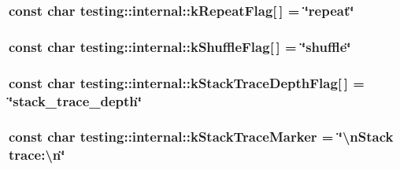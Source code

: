 \subsubsection[{\texorpdfstring{k\+Repeat\+Flag}{kRepeatFlag}}]{\setlength{\rightskip}{0pt plus 5cm}const char testing\+::internal\+::k\+Repeat\+Flag\mbox{[}$\,$\mbox{]} = \char`\"{}repeat\char`\"{}}\hypertarget{namespacetesting_1_1internal_a764ee423d39ebb8e10c53ab9b685cd9b}{}\label{namespacetesting_1_1internal_a764ee423d39ebb8e10c53ab9b685cd9b}
\subsubsection[{\texorpdfstring{k\+Shuffle\+Flag}{kShuffleFlag}}]{\setlength{\rightskip}{0pt plus 5cm}const char testing\+::internal\+::k\+Shuffle\+Flag\mbox{[}$\,$\mbox{]} = \char`\"{}shuffle\char`\"{}}\hypertarget{namespacetesting_1_1internal_affd2c1118505cb97d8ff728c95fc722b}{}\label{namespacetesting_1_1internal_affd2c1118505cb97d8ff728c95fc722b}
\subsubsection[{\texorpdfstring{k\+Stack\+Trace\+Depth\+Flag}{kStackTraceDepthFlag}}]{\setlength{\rightskip}{0pt plus 5cm}const char testing\+::internal\+::k\+Stack\+Trace\+Depth\+Flag\mbox{[}$\,$\mbox{]} = \char`\"{}stack\+\_\+trace\+\_\+depth\char`\"{}}\hypertarget{namespacetesting_1_1internal_ad6f90e66d431ca3a9084408878c2cc77}{}\label{namespacetesting_1_1internal_ad6f90e66d431ca3a9084408878c2cc77}
\subsubsection[{\texorpdfstring{k\+Stack\+Trace\+Marker}{kStackTraceMarker}}]{\setlength{\rightskip}{0pt plus 5cm}const char testing\+::internal\+::k\+Stack\+Trace\+Marker = \char`\"{}\textbackslash{}n\+Stack {\bf trace\+:\textbackslash{}n}\char`\"{}}\hypertarget{namespacetesting_1_1internal_abb38528ca6a45df265b19f5ccb3d16d9}{}\label{namespacetesting_1_1internal_abb38528ca6a45df265b19f5ccb3d16d9}
